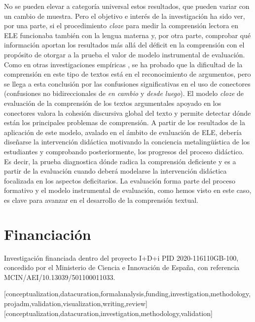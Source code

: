 \documentclass[spanish]{textolivre}
\begin{document}
No se pueden elevar a categoría universal estos resultados, que pueden variar con un cambio de muestra. Pero el objetivo e interés de la investigación ha sido ver, por una parte, si el procedimiento \emph{cloze} para medir la comprensión lectora en ELE funcionaba también con la lengua materna y, por otra parte, comprobar qué información aportan los resultados más allá del déficit en la comprensión con el propósito de otorgar a la prueba el valor de modelo instrumental de evaluación. Como en otras investigaciones empíricas \cite{alvarez_dificultades_2017}, se ha probado que la dificultad de la comprensión en este tipo de textos está en el reconocimiento de argumentos, pero se llega a esta conclusión por las confusiones significativas en el uso de conectores (confusiones no bidireccionales de \emph{en cambio} y \emph{desde luego}). El modelo \emph{cloze} de evaluación de la comprensión de los textos argumentales apoyado en los conectores valora la cohesión discursiva global del texto y permite detectar dónde están los principales problemas de comprensión. A partir de los resultados de la aplicación de este modelo, avalado en el ámbito de evaluación de ELE, debería diseñarse la intervención didáctica motivando la conciencia metalingüística de los estudiantes y comprobando posteriormente, los progresos del proceso didáctico. Es decir, la prueba diagnostica dónde radica la comprensión deficiente y es a partir de la evaluación cuando deberá modelarse la intervención didáctica focalizada en los aspectos deficitarios. La evaluación forma parte del proceso formativo y el modelo instrumental de evaluación, como hemos visto en este caso, es clave para avanzar en el desarrollo de la comprensión textual.

\section{Financiación}
Investigación financiada dentro del proyecto I+D+i PID 2020-116110GB-100, concedido por el Ministerio de Ciencia e Innovación de España, con referencia MCIN/AEI/10.13039/501100011033.

\printbibliography\label{sec-bib}


\begin{contributors}
[conceptualization,datacuration,formalanalysis,funding,investigation,methodology,projadm,validation,visualization,writing,review]
[conceptualization,datacuration,investigation,methodology,validation]
\end{contributors}
\end{document}
